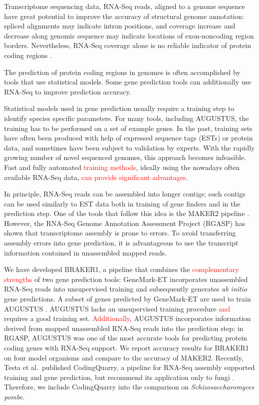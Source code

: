 \documentclass{bioinfo}
\begin{document}
Transcriptome sequencing data, RNA-Seq reads, aligned to a genome sequence have great potential to improve the accuracy of structural genome annotation: spliced alignments may indicate intron positions, and coverage increase and decrease along genomic sequence may indicate locations of exon-noncoding region borders. Nevertheless, RNA-Seq coverage alone is no reliable indicator of protein coding regions \citep{InsectOpinion2015}. 

The prediction of protein coding regions in genomes is often accomplished by tools that use statistical models. Some gene prediction tools can additionally use RNA-Seq 
 to improve prediction accuracy.

Statistical models used in gene prediction usually require a training  step to identify species specific parameters. For many tools, including AUGUSTUS, the training has to be performed on a set of example genes. In the past, training sets have often been produced with help of expressed sequence tags (ESTs) or protein data, and sometimes have been subject to validation by experts. With the rapidly growing number of novel sequenced genomes, this approach becomes infeasible. Fast and fully automated \textcolor{red}{training methods}, ideally using the nowadays often available RNA-Seq data, \textcolor{red}{can provide significant advantages}.

In principle, RNA-Seq reads can be assembled into longer contigs\textcolor{red}{;} such contigs can be used similarly to EST data both in training of gene finders and in the prediction step. One of the tools that follow this idea is the MAKER2 pipeline \citep{MAKER2}. However, the RNA-Seq Genome Annotation Assessment Project (RGASP) \citep{RGASP} has shown that transcriptome assembly is prone to errors. To avoid transferring assembly errors into gene prediction, it is advantageous to use the transcript information contained in unassembled mapped reads.

We have developed BRAKER1, a pipeline that combines the \textcolor{red}{complementary strengths} of two gene prediction tools: GeneMark-ET \citep{GeneMark-ET} incorporates unassembled RNA-Seq reads into unsupervised training and subsequently generates \textit{ab initio} gene predictions. A subset of genes predicted by GeneMark-ET are used to train AUGUSTUS \citep{AUGUSTUS}. AUGUSTUS lacks an unsupervised training procedure \textcolor{red}{and} requires a good training set. \textcolor{red}{Additionally}, AUGUSTUS incorporates information derived from mapped unassembled RNA-Seq reads into the prediction step; in RGASP, AUGUSTUS was one of the most accurate tools for predicting protein coding genes with RNA-Seq support. We report accuracy results for BRAKER1 on four model organisms and compare to the accuracy of MAKER2. Recently, Testa et al.~published CodingQuarry, a pipeline for RNA-Seq assembly supported training and gene prediction, but recommend its application only to fungi \citep{CodingQuarry}. Therefore, we 
include CodingQuarry into the comparison on \textit{Schizosaccharomyces pombe}.
\end{document}

